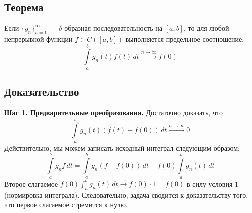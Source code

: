 \documentclass[12pt,a4paper,openany]{book}
\begin{document}
\begin{center}
\end{center}

\subsection{Теорема}
Если $\{g_n\}_{n=1}^{\infty}$ — $\delta$-образная последовательность на $[a, b]$, то для любой непрерывной функции $f \in C([a, b])$ выполняется предельное соотношение:
\[
\int\limits_{a}^{b} g_n(t) f(t)\,dt \xrightarrow{n \to \infty} f(0)
\]

\subsection{Доказательство}

\textbf{Шаг 1. Предварительные преобразования.}
Достаточно доказать, что
\[
\int\limits_{a}^{b} g_n(t) (f(t) - f(0))\,dt \xrightarrow{n \to \infty} 0
\]
Действительно, мы можем записать исходный интеграл следующим образом:
\[
\int\limits_{a}^{b} g_n f\,dt = \int\limits_{a}^{b} g_n(f - f(0))\,dt + f(0)\int\limits_{a}^{b} g_n(t)\,dt
\]
Второе слагаемое $f(0)\int_{a}^{b} g_n(t)\,dt \to f(0) \cdot 1 = f(0)$ в силу условия 1 (нормировка интеграла). Следовательно, задача сводится к доказательству того, что первое слагаемое стремится к нулю.
\end{document}
